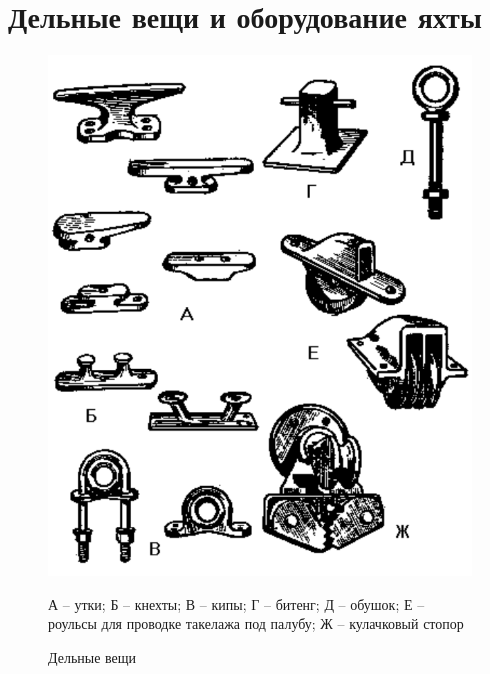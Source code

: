 \documentclass[a4paper, 12pt, twoside, final]{scrbook}
\begin{document}
%
%

\section{Дельные вещи и оборудование яхты}


\begin{figure}[htbp]
\begin{centering}
\includegraphics{pics/50_Delnye_veshi}
\par\end{centering}

\protect\caption{\label{fig:50}Дельные вещи}

\begin{centering} \small
А \--- утки; Б \--- кнехты; В \--- кипы; Г \--- битенг; Д \--- обушок; Е \--- роульсы для проводке такелажа под палубу; Ж \--- кулачковый стопор
\par\end{centering}

\end{figure}
\end{document}
